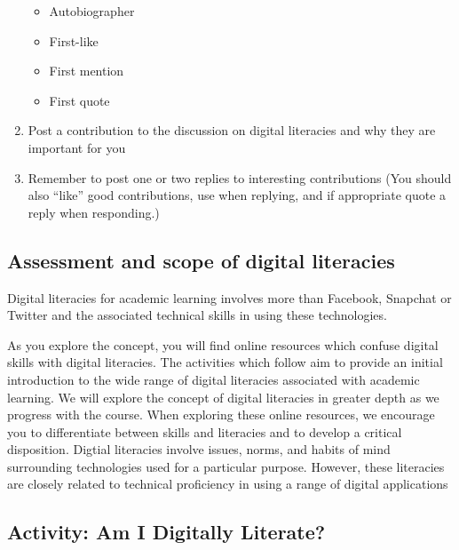 \documentclass[
]{book}
\providecommand{\tightlist}{%
  \setlength{\itemsep}{0pt}\setlength{\parskip}{0pt}}
\theoremstyle{definition}
\theoremstyle{definition}
\theoremstyle{definition}
\theoremstyle{definition}
\theoremstyle{remark}
\begin{document}
\begin{reflect}
\begin{enumerate}
  \begin{itemize}
  \tightlist
  \item
    Autobiographer\\
  \item
    First-like\\
  \item
    First mention\\
  \item
    First quote\\
  \end{itemize}
\item
  Post a contribution to the discussion on digital literacies and why they are important for you\\
\item
  Remember to post one or two replies to interesting contributions (You should also ``like'' good contributions, use \citet{username} when replying, and if appropriate quote a reply when responding.)
\end{enumerate}
\end{reflect}

\hypertarget{assessment-and-scope-of-digital-literacies}{%
\subsection*{Assessment and scope of digital literacies}\label{assessment-and-scope-of-digital-literacies}}

Digital literacies for academic learning involves more than Facebook, Snapchat or Twitter and the associated technical skills in using these technologies.

As you explore the concept, you will find online resources which confuse digital skills with digital literacies. The activities which follow aim to provide an initial introduction to the wide range of digital literacies associated with academic learning. We will explore the concept of digital literacies in greater depth as we progress with the course. When exploring these online resources, we encourage you to differentiate between skills and literacies and to develop a critical disposition. Digtial literacies involve issues, norms, and habits of mind surrounding technologies used for a particular purpose. However, these literacies are closely related to technical proficiency in using a range of digital applications

\hypertarget{activity-am-i-digitally-literate}{%
\subsection*{Activity: Am I Digitally Literate?}\label{activity-am-i-digitally-literate}}
\end{document}
